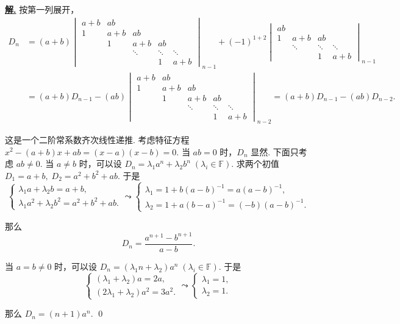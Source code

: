 \documentclass[10pt,openany]{article}
\theoremstyle{thmstyle} %
\theoremstyle{defstyle} %
\theoremstyle{prostyle} %
\theoremstyle{exastyle}
\theoremstyle{remstyle}
\newenvironment{solution}{\par\underline{\textbf{解.}} \;\fangsong}{\qed\par}
\newcommand{\F}{\mathbb{F}}
\begin{document}
\begin{solution}
	按第一列展开，
	\begin{align*}
		D_n&= (a+b)\begin{vmatrix}
			a+b & ab   &        &        &        \\
			1   & a+b  & ab     &        &        \\
			& 1    & a+b    & ab     &        \\
			&      & \ddots & \ddots & \ddots \\
			&      &        & 1      & a+b
		\end{vmatrix}_{n-1}+(-1)^{1+2} \begin{vmatrix}
			ab   &        &        &        \\
			1    & a+b    & ab     &        \\
			& \ddots & \ddots & \ddots \\
			&        & 1      & a+b
		\end{vmatrix}_{n-1} \\
		&= (a+b)D_{n-1}-(ab)\begin{vmatrix}
			a+b & ab   &        &        &        \\
			1   & a+b  & ab     &        &        \\
			& 1    & a+b    & ab     &        \\
			&      & \ddots & \ddots & \ddots \\
			&      &        & 1      & a+b
		\end{vmatrix}_{n-2}=(a+b)D_{n-1}-(ab)D_{n-2}.
	\end{align*}

   这是一个二阶常系数齐次线性递推. 考虑特征方程 \( x^2-(a+b)x+ab=(x-a)(x-b)=0 \). 当 \( ab=0 \) 时，\( D_n \) 显然. 下面只考虑 \( ab \neq 0 \). 当 \( a \neq b \) 时，可以设 \( D_n=\lambda_1 a^n+ \lambda_2 b^n \; (\lambda_i \in \F) \). 求两个初值 \( D_1=a+b, \; D_2=a^2+b^2+ab \). 于是
   \[ \left\{ \begin{array}{l}
   	\lambda_1 a+ \lambda_2 b = a+b, \\
   	\lambda_1 a^2+ \lambda_2 b^2= a^2+b^2+ab.
   \end{array}\right. \leadsto  \left\{ \begin{array}{l}
   \lambda_1=1+b(a-b)^{-1}=a(a-b)^{-1}, \\
   \lambda_2=1+a(b-a)^{-1}=(-b)(a-b)^{-1}.
   \end{array}\right. \]
   
   那么 
   \[ D_n=\frac{a^{n+1}-b^{n+1}}{a-b}. \]
   
   当 \( a = b \neq 0 \) 时，可以设 \( D_n=(\lambda_1n+\lambda_2)a^n \; (\lambda_i \in \F)  \). 于是
   \[ \left\{ \begin{array}{l}
   	(\lambda_1+\lambda_2)a = 2a, \\
   	(2\lambda_1+\lambda_2)a^2= 3a^2.
   \end{array}\right. \leadsto  \left\{ \begin{array}{l}
   	\lambda_1=1, \\
   	\lambda_2=1.
   \end{array}\right. \]
   
   那么 \( D_n=(n+1)a^n \).
\end{solution}
\end{document}
